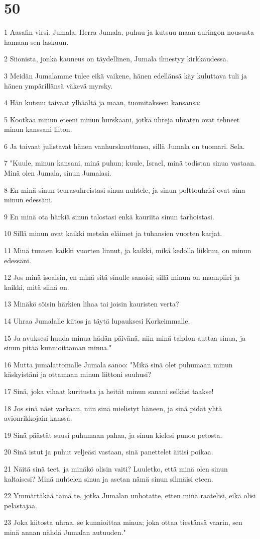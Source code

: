 \chapter{50}

\par 1 Aasafin virsi. Jumala, Herra Jumala, puhuu ja kutsuu maan auringon noususta hamaan sen laskuun.
\par 2 Siionista, jonka kauneus on täydellinen, Jumala ilmestyy kirkkaudessa.
\par 3 Meidän Jumalamme tulee eikä vaikene, hänen edellänsä käy kuluttava tuli ja hänen ympärillänsä väkevä myrsky.
\par 4 Hän kutsuu taivaat ylhäältä ja maan, tuomitakseen kansansa:
\par 5 Kootkaa minun eteeni minun hurskaani, jotka uhreja uhraten ovat tehneet minun kanssani liiton.
\par 6 Ja taivaat julistavat hänen vanhurskauttansa, sillä Jumala on tuomari. Sela.
\par 7 "Kuule, minun kansani, minä puhun; kuule, Israel, minä todistan sinua vastaan. Minä olen Jumala, sinun Jumalasi.
\par 8 En minä sinun teurasuhreistasi sinua nuhtele, ja sinun polttouhrisi ovat aina minun edessäni.
\par 9 En minä ota härkiä sinun talostasi enkä kauriita sinun tarhoistasi.
\par 10 Sillä minun ovat kaikki metsän eläimet ja tuhansien vuorten karjat.
\par 11 Minä tunnen kaikki vuorten linnut, ja kaikki, mikä kedolla liikkuu, on minun edessäni.
\par 12 Jos minä isoaisin, en minä sitä sinulle sanoisi; sillä minun on maanpiiri ja kaikki, mitä siinä on.
\par 13 Minäkö söisin härkien lihaa tai joisin kauristen verta?
\par 14 Uhraa Jumalalle kiitos ja täytä lupauksesi Korkeimmalle.
\par 15 Ja avuksesi huuda minua hädän päivänä, niin minä tahdon auttaa sinua, ja sinun pitää kunnioittaman minua."
\par 16 Mutta jumalattomalle Jumala sanoo: "Mikä sinä olet puhumaan minun käskyistäni ja ottamaan minun liittoni suuhusi?
\par 17 Sinä, joka vihaat kuritusta ja heität minun sanani selkäsi taakse!
\par 18 Jos sinä näet varkaan, niin sinä mielistyt häneen, ja sinä pidät yhtä avionrikkojain kanssa.
\par 19 Sinä päästät suusi puhumaan pahaa, ja sinun kielesi punoo petosta.
\par 20 Sinä istut ja puhut veljeäsi vastaan, sinä panettelet äitisi poikaa.
\par 21 Näitä sinä teet, ja minäkö olisin vaiti? Luuletko, että minä olen sinun kaltaisesi? Minä nuhtelen sinua ja asetan nämä sinun silmäisi eteen.
\par 22 Ymmärtäkää tämä te, jotka Jumalan unhotatte, etten minä raatelisi, eikä olisi pelastajaa.
\par 23 Joka kiitosta uhraa, se kunnioittaa minua; joka ottaa tiestänsä vaarin, sen minä annan nähdä Jumalan autuuden."

